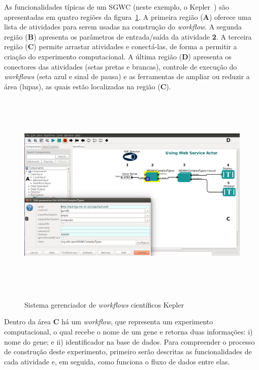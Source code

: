 As funcionalidades típicas de um SGWC (neste exemplo, o Kepler~\cite{kepler2014}) são apresentadas em quatro regiões da figura~\ref{figura_SGWC_Kepler_exemplo_de_workflow}. A primeira região (\textbf{A}) oferece uma lista de atividades para serem usadas na construção do \emph{workflow}. A segunda região (\textbf{B}) apresenta os parâmetros de entrada/saída da atividade \textbf{2}. A terceira região (\textbf{C}) permite arrastar atividades e conectá-las, de forma a permitir a criação do experimento computacional. A última região (\textbf{D}) apresenta os conectores das atividades (setas pretas e brancas), controle de execução do \emph{workflows} (seta azul e sinal de pausa) e as ferramentas de ampliar ou reduzir a área (lupas), as quais estão localizadas na região (\textbf{C}).
\begin{figure}[!hbt]
    \centering  
    \caption{Sistema gerenciador de \emph{workflows} científicos Kepler}
    \includegraphics[width=16cm,height=10cm]{./secoes/conceitosFundamentais/pics/img/webService.png}    
	\label{figura_SGWC_Kepler_exemplo_de_workflow}
	\vspace{0.1cm}
\end{figure}

Dentro da área \textbf{C} há um \emph{workflow}, que representa um experimento computacional, o qual recebe o nome de um gene e retorna duas informações: i) nome do gene; e ii) identificador na base de dados. Para compreender o processo de construção deste experimento, primeiro serão descritas as funcionalidades de cada atividade e, em seguida, como funciona o fluxo de dados entre elas.


